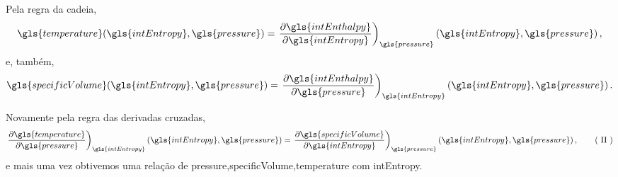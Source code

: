     Pela regra da cadeia,
    \begin{equation} \label{eq:5.12}
        \gls{temperature}
        \functionOf{
            \gls{intEntropy},
            \gls{pressure}
        }
        =
        \ddxconsty{
            \gls{intEnthalpy}
        }{
            \gls{intEntropy}
        }{
            \gls{pressure}
        }
        \functionOf{
            \gls{intEntropy},
            \gls{pressure}
        }\,,
    \end{equation}
    \noindent e, também,
    \begin{equation} \label{eq:5.13}
        \gls{specificVolume}
        \functionOf{
            \gls{intEntropy},
            \gls{pressure}
        }
        =
        \ddxconsty{
            \gls{intEnthalpy}
        }{
            \gls{pressure}
        }{
            \gls{intEntropy}
        }
        \functionOf{
            \gls{intEntropy},
            \gls{pressure}
        }\,.
    \end{equation}

    Novamente pela regra das derivadas cruzadas,
    \begin{equation} \label{eq:5.14}
        \ddxconsty{
            \gls{temperature}
        }{
            \gls{pressure}
        }{
            \gls{intEntropy}
        }
        \functionOf{
            \gls{intEntropy},
            \gls{pressure}
        }
        =
        \ddxconsty{
            \gls{specificVolume}
        }{
            \gls{intEntropy}
        }{
            \gls{pressure}
        }
        \functionOf{
            \gls{intEntropy},
            \gls{pressure}
        }\,,
        \tag{\romannumber{2}}
    \end{equation}
    \noindent e mais uma vez obtivemos uma relação de
    \gls{pressure},\gls{specificVolume},\gls{temperature} com \gls{intEntropy}.

